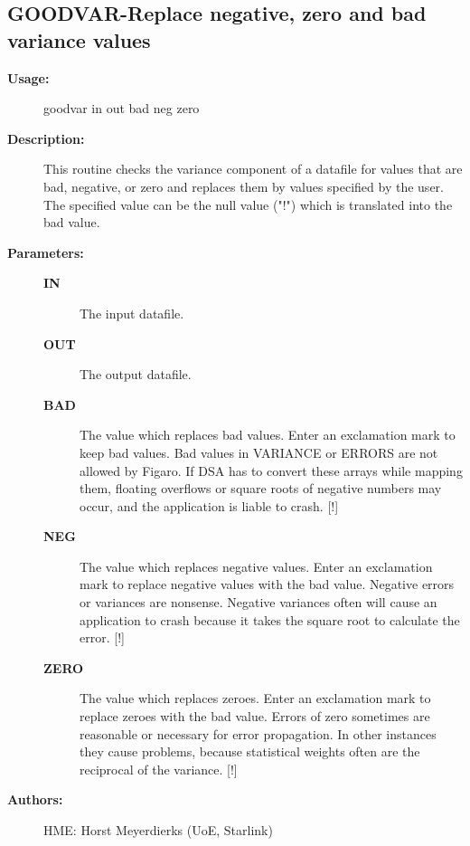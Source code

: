 \subsection{GOODVAR-\label{GOODVAR}Replace negative, zero and bad variance values}
\begin{description}

\item [{\bf Usage:}]
 goodvar in out bad neg zero

\item [{\bf Description:}]
 This routine checks the variance component of a datafile for
 values that are bad, negative, or zero and replaces them by
 values specified by the user. The specified value can be the
 null value ("!") which is translated into the bad value.

\item [{\bf Parameters:}]
\begin{description}
\item [{\bf IN}]
 The input datafile.
\item [{\bf OUT}]
 The output datafile.
\item [{\bf BAD}]
 The value which replaces bad values. Enter an exclamation mark
 to keep bad values.
 Bad values in VARIANCE or ERRORS are not allowed by Figaro. If
 DSA has to convert these arrays while mapping them, floating
 overflows or square roots of negative numbers may occur, and
 the application is liable to crash. [!]
\item [{\bf NEG}]
 The value which replaces negative values. Enter an exclamation
 mark to replace negative values with the bad value. Negative
 errors or variances are nonsense. Negative variances often will
 cause an application to crash because it takes the square root
 to calculate the error. [!]
\item [{\bf ZERO}]
 The value which replaces zeroes. Enter an exclamation mark
 to replace zeroes with the bad value.
 Errors of zero sometimes are reasonable or necessary for error
 propagation. In other instances they cause problems, because
 statistical weights often are the reciprocal of the variance.
 [!]
\end{description}

\item [{\bf Authors:}]
 HME: Horst Meyerdierks (UoE, Starlink)
\end{description}

